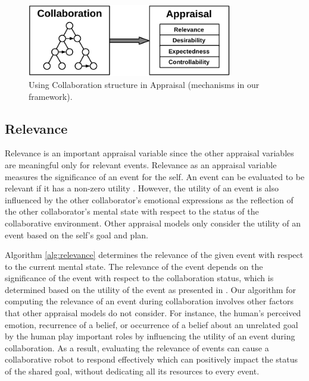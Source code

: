 \documentclass[12pt]{report}
\begin{document}
\begin{figure}[tbh]
  \centering
  \includegraphics[width=0.8\textwidth]{figure/appraisal-collaboration-croped.pdf}
  \caption{Using Collaboration structure in Appraisal (mechanisms in our
  framework).}
  \label{fig:appraisal-collaboration}
\end{figure}

\subsection{Relevance}
Relevance is an important appraisal variable since the other appraisal variables
are meaningful only for relevant events. Relevance as an appraisal variable
measures the significance of an event for the self. An event can be evaluated to
be relevant if it has a non-zero utility \cite{marsella:ema-process-model}.
However, the utility of an event is also influenced by the other collaborator's
emotional expressions as the reflection of the other collaborator's mental state
with respect to the status of the collaborative environment. Other appraisal
models only consider the utility of an event based on the self's goal and plan.

Algorithm \ref{alg:relevance} determines the relevance of the given event with
respect to the current mental state. The relevance of the event depends on the
significance of the event with respect to the collaboration status, which is
determined based on the utility of the event as presented in
\cite{gratch:domain-independent,marsella:ema-process-model}. Our algorithm for
computing the relevance of an event during collaboration involves other factors
that other appraisal models do not consider. For instance, the human's
perceived emotion, recurrence of a belief, or occurrence of a belief about an
unrelated goal by the human play important roles by influencing the utility
of an event during collaboration. As a result, evaluating the relevance of
events can cause a collaborative robot to respond effectively which can
positively impact the status of the shared goal, without dedicating all its
resources to every event.
\end{document}
